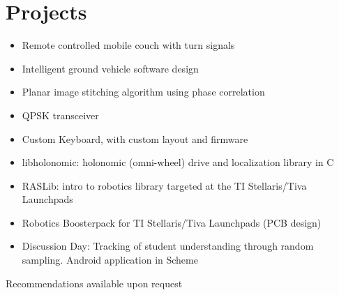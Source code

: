 \documentclass[letterpaper,12pt]{resume}
\begin{document}
\section{Projects}
\begin{itemize} 
  \item
    Remote controlled mobile couch with turn signals
  \item
    Intelligent ground vehicle software design
  \item
    Planar image stitching algorithm using phase correlation
  \item
    QPSK transceiver
  \item
    Custom Keyboard, with custom layout and firmware
  \item
    libholonomic: holonomic (omni-wheel) drive and localization library in C
  \item
    RASLib: intro to robotics library targeted at the TI Stellaris/Tiva Launchpads
  \item
    Robotics Boosterpack for TI Stellaris/Tiva Launchpads (PCB design)
  \item 
    Discussion Day: Tracking of student understanding through random sampling. Android application in Scheme
\end{itemize}

\par
\begin{center}
  Recommendations available upon request
\end{center}
\end{document}
